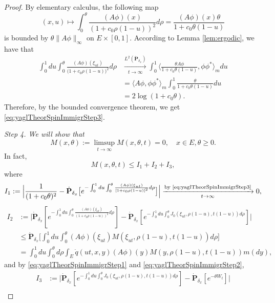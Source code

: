 \begin{proof}
	By elementary calculus, the following map
\[
	(x,u)
	\mapsto\int_0^\theta \frac{ (A\phi)(x)}{(1+c_0\rho(1-u))^2} d\rho
	= \frac{ (A\phi)(x)\theta}{1+c_0\theta(1-u)}
\]
	is bounded by $\theta\| A\phi\|_\infty$ on $E\times[0,1]$.
	According to Lemma \ref{lem:ergodic}, we have that
\[\begin{split}
	\int_0^1 du \int_0^\theta \frac{ (A\phi)(\xi_{ut})}{\big(1+c_0\rho(1-u)\big)^2} d\rho
	&\xrightarrow[t\to\infty]{L^2(\dot{\mathbf P}_{\delta_x})} \int_0^1 \big\langle \frac{\theta A\phi}{1+c_0\theta(1-u)},\phi\phi^* \big\rangle_m du\\
	&= \langle  A\phi,\phi\phi^*\rangle_m\int_0^1 \frac{\theta}{1+c_0\theta(1-u)}du \\
	&=2\log(1+c_0\theta).
\end{split}\]
	Therefore, by the bounded convergence theorem, we get \eqref{eq:yaglTheorSpinImmigrStep3}.
\par
	\emph{Step 4. We will show that}
\begin{equation}\label{eq:yaglTheorSpinImmigrStep4}
	M(x,\theta)
	:=\limsup_{t\to\infty}M(x,\theta,t)=0,
	\quad x\in E,\theta\geq 0.
\end{equation}
	In fact,
\begin{equation}\label{eq:separate-M-into-3-parts}
	M(x,\theta,t)
	\leq I_1+I_2+I_3,
\end{equation}
	where
\[
	I_1
	:=\Big|\frac{1}{(1+c_0\theta)^2}- \dot {\mathbf P}_{\delta_x} \big[e^{- \int_0^1 du \int_0^\theta \frac{ (A\phi)(\xi_{ut})}{[1+c_0\rho(1-u)]^2}d\rho }\big]\Big|
	\xrightarrow[t\to\infty]{\text{by \eqref{eq:yaglTheorSpinImmigrStep3}}} 0,
\]
\[\begin{split}
	I_2
	&:=\Big| \dot {\mathbf P}_{\delta_x} [e^{- \int_0^1 du \int_0^\theta  \frac{ (A\phi)(\xi_{ut})}{(1+c_0\rho(1-u))^2} d\rho}]-\dot{\mathbf P}_{\delta_x}[e^{-\int_0^1 du\int_0^{\theta} J_0(\xi_{ut},\rho(1-u),t(1-u)) d\rho}]\Big|\\
	&\leq\dot{\mathbf P}_{\delta_x}\Big[\int_0^1du\int_0^\theta (A\phi)(\xi_{ut})M(\xi_{ut},\rho(1-u),t(1-u))d\rho \Big]\\
	&=\int_0^1du\int_0^\theta d\rho \int_{E} \dot{q}(ut,x,y) (A\phi)(y)M(y,\rho(1-u),t(1-u)) m(dy),
\end{split}\]
	and by \eqref{eq:yaglTheorSpinImmigrStep1} and \eqref{eq:yaglTheorSpinImmigrStep2},
\[\begin{split}
	I_3
	&:=\big|\dot{\mathbf P}_{\delta_x}[e^{-\int_0^1 du\int_0^{\theta} J_0(\xi_{ut},\rho(1-u),t(1-u)) d\rho }]-\dot{\mathbf P}_{\delta_x}[e^{-\theta W_t}]\big|\\

\end{split}\]
\end{proof}
